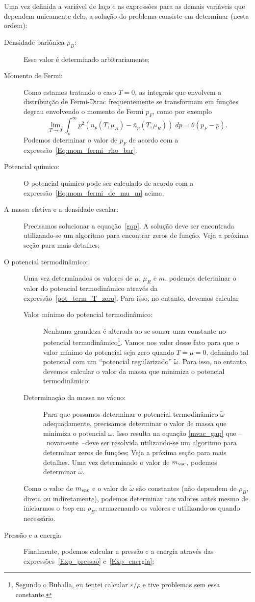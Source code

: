 Uma vez definida a variável de laço e as expressões para as demais variáveis que dependem unicamente dela, a solução do problema consiste em determinar (nesta ordem):
\begin{description}
	\item[Densidade bariônica $\rho_B$:] Esse valor é determinado arbitrariamente;
	\item[Momento de Fermi:] Como estamos tratando o caso $T = 0$, as integrais que envolvem a distribuição de Fermi-Dirac frequentemente se transformam em funções degrau envolvendo o momento de Fermi $p_F$, como por exemplo
		\begin{equation}
			\lim_{T \to 0} \int_o^\infty p^2 (n_p(T, \mu_R) - \bar{n}_p(T, \mu_R)) \;dp = \theta(p_F - p).
		\end{equation}
		Podemos determinar o valor de $p_F$ de acordo com a expressão~\eqref{Eq:mom_fermi_rho_bar}.
	\item[Potencial químico:] O potencial químico pode ser calculado de acordo com a expressão~\eqref{Eq:mom_fermi_de_mu_m} acima.
	\item[A massa efetiva e a densidade escalar:] Precisamos solucionar a equação~\eqref{gap}. A solução deve ser encontrada utilizando-se um algoritmo para encontrar zeros de função. Veja a próxima seção para mais detalhes;
	\item[O potencial termodinâmico:] Uma vez determinados os valores de $\mu$, $\mu_R$ e $m$, podemos determinar o valor do potencial termodinâmico através da expressão~\eqref{pot_term_T_zero}. Para isso, no entanto, devemos calcular
		\begin{description}
			\item[Valor mínimo do potencial termodinâmico:] Nenhuma grandeza é alterada ao se somar uma constante no potencial termodinâmico\footnote{Segundo o Buballa, eu tentei calcular $\varepsilon/\rho$ e tive problemas sem essa constante.}. Vamos nos valer desse fato para que o valor mínimo do potencial seja zero quando $T = \mu = 0$, definindo tal potencial com um ``potencial regularizado'' $\tilde\omega$. Para isso, no entanto, devemos calcular o valor da massa que minimiza o potencial termodinâmico;
			\item[Determinação da massa no vácuo:] Para que possamos determinar o potencial termodinâmico $\tilde\omega$ adequadamente, precisamos determinar o valor de massa que minimiza o potencial $\omega$. Isso resulta na equação \ref{mvac_gap} que --~novamente~--deve ser resolvida utilizando-se um algoritmo para determinar zeros de funções; Veja a próxima seção para mais detalhes. Uma vez determinado o valor de $m_{\rm{vac}}$, podemos determinar $\tilde\omega$.
		\end{description}	
		Como o valor de $m_{\rm{vac}}$ e o valor de $\tilde\omega$ são constantes (não dependem de $\rho_B$, direta ou indiretamente), podemos determinar tais valores antes mesmo de iniciarmos o \emph{loop} em $\rho_B$, armazenando os valores e utilizando-os quando necessário.
	\item[Pressão e a energia] Finalmente, podemos calcular a pressão e a energia através das expressões~\eqref{Exp_pressao} e~\eqref{Exp_energia};
\end{description}
